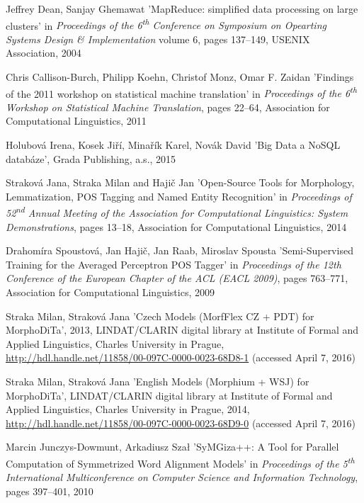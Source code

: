\begin{thebibliography}{99}
Jeffrey Dean, Sanjay Ghemawat
'MapReduce: simplified data processing on large clusters'
in \textit{Proceedings of the 6\textsuperscript{th} Conference on Symposium on Opearting Systems Design \& Implementation}
volume 6,
pages 137--149,
USENIX Association,
2004

Chris Callison-Burch, Philipp Koehn, Christof Monz, Omar F. Zaidan
'Findings of the 2011 workshop on statistical machine translation'
in \textit{Proceedings of the 6\textsuperscript{th} Workshop on Statistical Machine Translation},
pages 22--64,
Association for Computational Linguistics,
2011

Holubová Irena, Kosek Jiří, Minařík Karel, Novák David
'Big Data a NoSQL databáze',
Grada Publishing, a.s., 
2015

Straková Jana, Straka Milan and Hajič Jan
'Open-Source Tools for Morphology, Lemmatization, POS Tagging and Named Entity Recognition'
in \textit{Proceedings of 52\textsuperscript{nd} Annual Meeting of the Association for Computational Linguistics: System Demonstrations},
pages 13--18,
Association for Computational Linguistics,
2014

Drahomíra Spoustová, Jan Hajič, Jan Raab, Miroslav Spousta
'Semi-Supervised Training for the Averaged Perceptron POS Tagger'
in \textit{Proceedings of the 12th Conference of the European Chapter of the ACL (EACL 2009)},
pages 763--771,
Association for Computational Linguistics,
2009

Straka Milan, Straková Jana
'Czech Models (MorfFlex CZ + PDT) for MorphoDiTa',
2013,
LINDAT/CLARIN digital library at Institute of Formal and Applied Linguistics, Charles University in Prague,
\url{http://hdl.handle.net/11858/00-097C-0000-0023-68D8-1} (accessed April 7, 2016)

Straka Milan, Straková Jana
'English Models (Morphium + WSJ) for MorphoDiTa',
LINDAT/CLARIN digital library at Institute of Formal and Applied Linguistics, Charles University in Prague,
2014,
\url{http://hdl.handle.net/11858/00-097C-0000-0023-68D9-0} (accessed April 7, 2016)


Marcin Junczys-Dowmunt, Arkadiusz Szał
'SyMGiza++: A Tool for Parallel Computation of Symmetrized Word Alignment Models'
in \textit{Proceedings of the 5\textsuperscript{th} International Multiconference on Computer Science and Information Technology},
pages 397--401,
2010


\end{thebibliography}
